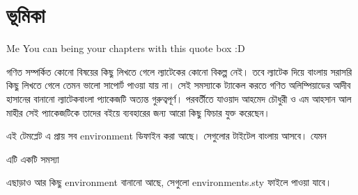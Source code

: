 \chapter{ভূমিকা}

\begin{chapquote}{Me}
    You can being your chapters with this quote box :D
\end{chapquote}

গণিত সম্পর্কিত কোনো বিষয়ের কিছু লিখতে গেলে ল্যাটেকের কোনো বিকল্প নেই। তবে ল্যাটেক দিয়ে বাংলায় সরাসরি কিছু লিখতে গেলে তেমন ভালো সাপোর্ট পাওয়া যায় না। সেই সমস্যাকে ট্যাকেল করতে গণিত অলিম্পিয়াডের আদীব হাসানের বানানো ল্যাটেকবাংলা প্যাকেজটি অত্যন্ত গুরুত্বপূর্ণ। পরবর্তীতে যাওয়াদ আহমেদ চৌধুরী ও এম আহসান আল মাহীর সেই প্যাকেজটিকে তাদের বইয়ে ব্যবহারের জন্য আরো কিছু ফিচার যুক্ত করেছেন। 

এই টেমপ্লেট এ প্রায় সব environment ডিফাইন করা আছে। সেগুলোর টাইটেল বাংলায় আসবে। যেমন

\begin{problem}
    এটি একটি সমস্যা
\end{problem}

এছাড়াও আর কিছু environment বানানো আছে, সেগুলো environments.sty ফাইলে পাওয়া যাবে।
